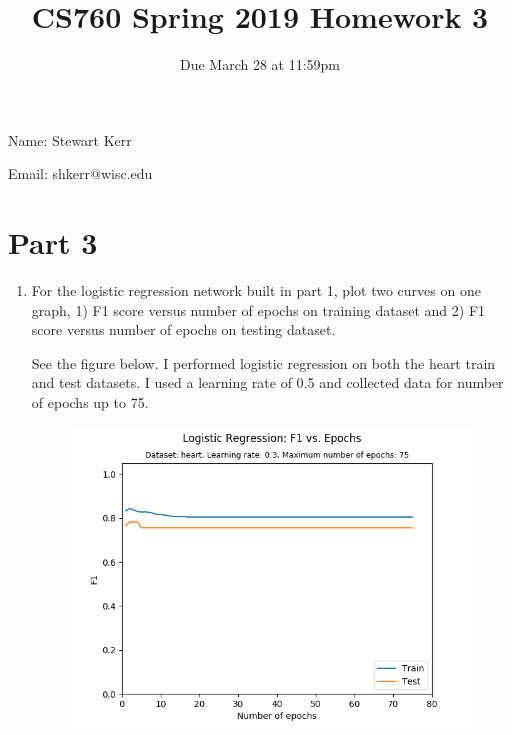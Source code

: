 \documentclass{article}
\title{CS760 Spring 2019 Homework 3}
\author{Due March 28 at 11:59pm}
\date{}
\newenvironment{soln}{
	\leavevmode\color{blue}\ignorespaces
}{}
\begin{document}
\maketitle



Name: Stewart Kerr

Email: shkerr@wisc.edu 



\section*{Part 3}

\begin{enumerate}
\item For the logistic regression network built in part 1, plot two curves on one graph, 1) F1 score versus number of epochs on training dataset and 2) F1 score versus number of epochs on testing dataset.

\begin{soln}
See the figure below. I performed logistic regression on both the heart train and test datasets. I used a learning rate of 0.5 and collected data for number of epochs up to 75.

\begin{figure}[h]
\centering
\includegraphics[scale=1]{figs/logistic_f1_curve}
\end{figure}
\end{soln}



\end{enumerate}
\end{document}
